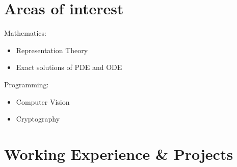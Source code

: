 \documentclass[10pt]{article}
\begin{document}
\section*{Areas of interest}
Mathematics:
\begin{itemize}
	\item Representation Theory
	\item Exact solutions of PDE and ODE
\end{itemize}
Programming:\begin{itemize}
	\item Computer Vision
	\item Cryptography
\end{itemize}

\section*{Working Experience \& Projects}
\end{document}
